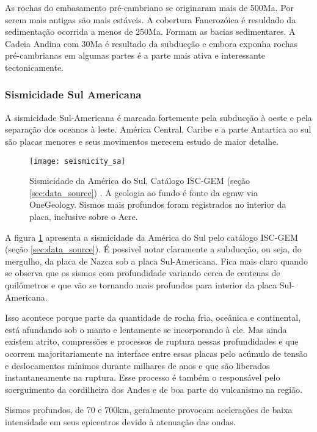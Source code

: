 As rochas do embasamento pré-cambriano se originaram mais de 500Ma. Por serem mais antigas
são mais estáveis. A cobertura Fanerozóica é resuldado da sedimentação ocorrida a menos de 250Ma. Formam as bacias
sedimentares. A Cadeia Andina com 30Ma é resultado da subducção e embora exponha rochas pré-cambrianas
em algumas partes é a parte mais ativa e interessante tectonicamente.


\subsubsection{Sismicidade Sul Americana}

A sismicidade Sul-Americana é marcada fortemente pela subducção à oeste e pela 
separação dos oceanos à leste. América Central, Caribe e a parte Antartica ao sul
são placas menores e seus movimentos merecem estudo de maior detalhe.

\begin{figure}[H]
  \centering
  \texttt{[image: seismicity\_sa]} 
  \caption{Sismicidade da América do Sul, Catálogo ISC-GEM (seção \ref{sec:data_source}) . 
  			A geologia ao fundo é fonte da \gls{cgmw} via OneGeology.
		   Sismos mais profundos foram registrados no interior da placa, inclusive sobre o Acre.
  		   }
  \label{fig:sa_seis} 
\end{figure}

A figura \ref{fig:sa_seis} apresenta a sismicidade da América do Sul pelo catálogo ISC-GEM
(seção \ref{sec:data_source}). É possivel notar claramente a subducção, ou seja, do mergulho, da placa de Nazca sob a placa
Sul-Americana. Fica mais claro quando se observa que os sismos com profundidade variando cerca de centenas de
quilômetros e que vão se tornando mais profundos para interior da placa Sul-Americana.

Isso acontece porque parte da quantidade de rocha fria, oceânica e continental, está afundando sob o manto
e lentamente se incorporando à ele. Mas ainda existem atrito, compressões e processos de ruptura nessas
profundidades e que ocorrem majoritariamente na interface entre essas placas pelo acúmulo de tensão e deslocamentos 
mínimos durante milhares de anos e que são liberados instantaneamente na ruptura. 
Esse processo é também o responsável pelo soerguimento da 
cordilheira dos Andes e de boa parte do vulcanismo na região. 

Sismos profundos, de 70 e 700km, geralmente provocam acelerações de baixa intensidade em seus epicentros 
devido à atenuação das ondas.

